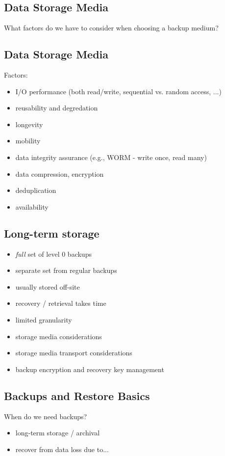 \documentclass[xga]{xdvislides}
\begin{document}
\subsection{Data Storage Media}
What factors do we have to consider when choosing a
backup medium?

\subsection{Data Storage Media}
Factors:
\begin{itemize}
	\item I/O performance (both read/write, sequential vs. random access, ...)
	\item reusability and degredation
	\item longevity
	\item mobility
	\item data integrity assurance (e.g., WORM - write once, read many)
	\item data compression, encryption
	\item deduplication
	\item availability
\end{itemize}

\subsection{Long-term storage}
\begin{itemize}
	\item {\em full} set of level 0 backups
	\item separate set from regular backups
	\item usually stored off-site
	\item recovery / retrieval takes time
	\item limited granularity
	\item storage media considerations
	\item storage media transport considerations
	\item backup encryption and recovery key management
\end{itemize}

\subsection{Backups and Restore Basics}
When do we need backups?
\begin{itemize}
	\item long-term storage / archival
	\item recover from data loss due to...
\end{itemize}
\vspace*{\fill}
\end{document}
